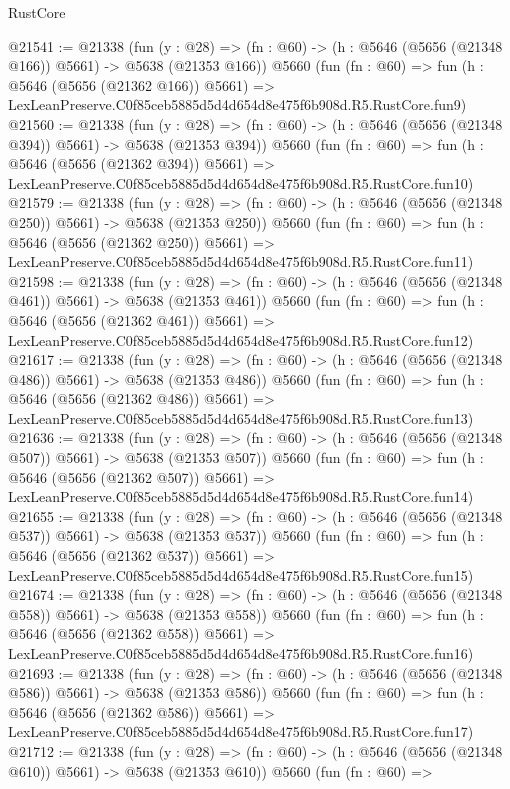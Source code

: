 \begin{lexlean}{RustCore}
\begin{coremodule}
@21541 := @21338
    (fun (y : @28) => (fn : @60) -> (h : @5646 (@5656 (@21348 @166)) @5661) -> @5638 (@21353 @166))
    @5660
    (fun (fn : @60) =>
    fun (h : @5646 (@5656 (@21362 @166)) @5661) =>
    LexLeanPreserve.C0f85ceb5885d5d4d654d8e475f6b908d.R5.RustCore.fun9)
@21560 := @21338
    (fun (y : @28) => (fn : @60) -> (h : @5646 (@5656 (@21348 @394)) @5661) -> @5638 (@21353 @394))
    @5660
    (fun (fn : @60) =>
    fun (h : @5646 (@5656 (@21362 @394)) @5661) =>
    LexLeanPreserve.C0f85ceb5885d5d4d654d8e475f6b908d.R5.RustCore.fun10)
@21579 := @21338
    (fun (y : @28) => (fn : @60) -> (h : @5646 (@5656 (@21348 @250)) @5661) -> @5638 (@21353 @250))
    @5660
    (fun (fn : @60) =>
    fun (h : @5646 (@5656 (@21362 @250)) @5661) =>
    LexLeanPreserve.C0f85ceb5885d5d4d654d8e475f6b908d.R5.RustCore.fun11)
@21598 := @21338
    (fun (y : @28) => (fn : @60) -> (h : @5646 (@5656 (@21348 @461)) @5661) -> @5638 (@21353 @461))
    @5660
    (fun (fn : @60) =>
    fun (h : @5646 (@5656 (@21362 @461)) @5661) =>
    LexLeanPreserve.C0f85ceb5885d5d4d654d8e475f6b908d.R5.RustCore.fun12)
@21617 := @21338
    (fun (y : @28) => (fn : @60) -> (h : @5646 (@5656 (@21348 @486)) @5661) -> @5638 (@21353 @486))
    @5660
    (fun (fn : @60) =>
    fun (h : @5646 (@5656 (@21362 @486)) @5661) =>
    LexLeanPreserve.C0f85ceb5885d5d4d654d8e475f6b908d.R5.RustCore.fun13)
@21636 := @21338
    (fun (y : @28) => (fn : @60) -> (h : @5646 (@5656 (@21348 @507)) @5661) -> @5638 (@21353 @507))
    @5660
    (fun (fn : @60) =>
    fun (h : @5646 (@5656 (@21362 @507)) @5661) =>
    LexLeanPreserve.C0f85ceb5885d5d4d654d8e475f6b908d.R5.RustCore.fun14)
@21655 := @21338
    (fun (y : @28) => (fn : @60) -> (h : @5646 (@5656 (@21348 @537)) @5661) -> @5638 (@21353 @537))
    @5660
    (fun (fn : @60) =>
    fun (h : @5646 (@5656 (@21362 @537)) @5661) =>
    LexLeanPreserve.C0f85ceb5885d5d4d654d8e475f6b908d.R5.RustCore.fun15)
@21674 := @21338
    (fun (y : @28) => (fn : @60) -> (h : @5646 (@5656 (@21348 @558)) @5661) -> @5638 (@21353 @558))
    @5660
    (fun (fn : @60) =>
    fun (h : @5646 (@5656 (@21362 @558)) @5661) =>
    LexLeanPreserve.C0f85ceb5885d5d4d654d8e475f6b908d.R5.RustCore.fun16)
@21693 := @21338
    (fun (y : @28) => (fn : @60) -> (h : @5646 (@5656 (@21348 @586)) @5661) -> @5638 (@21353 @586))
    @5660
    (fun (fn : @60) =>
    fun (h : @5646 (@5656 (@21362 @586)) @5661) =>
    LexLeanPreserve.C0f85ceb5885d5d4d654d8e475f6b908d.R5.RustCore.fun17)
@21712 := @21338
    (fun (y : @28) => (fn : @60) -> (h : @5646 (@5656 (@21348 @610)) @5661) -> @5638 (@21353 @610))
    @5660
    (fun (fn : @60) =>

\end{coremodule}
\end{lexlean}
